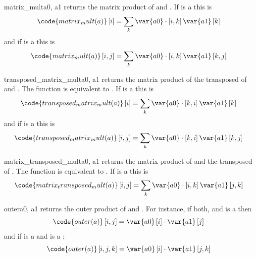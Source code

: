\begin{funcdesc}{matrix_mult}{a0, a1}
returns the matrix product of  and .
If  is a \RankOne this is
\begin{equation}
\code{matrix_mult(a)}\left[i\right]=\sum_{k}\var{a0}  \cdot \left[i,k\right]\var{a1} \left[k\right]
\end{equation}
and if  is a \RankTwo this is
\begin{equation}
\code{matrix_mult(a)}\left[i,j\right]=\sum_{k}\var{a0}  \cdot \left[i,k\right]\var{a1} \left[k,j\right]
\end{equation}
\end{funcdesc}

\begin{funcdesc}{transposed_matrix_mult}{a0, a1}
returns the matrix product of the transposed of  and .
The function is equivalent to .
If  is a \RankOne this is
\begin{equation}
\code{transposed_matrix_mult(a)}\left[i\right]=\sum_{k}\var{a0}  \cdot \left[k,i\right]\var{a1} \left[k\right]
\end{equation}
and if  is a \RankTwo this is
\begin{equation}
\code{transposed_matrix_mult(a)}\left[i,j\right]=\sum_{k}\var{a0}  \cdot \left[k,i\right]\var{a1} \left[k,j\right]
\end{equation}
\end{funcdesc}

\begin{funcdesc}{matrix_transposed_mult}{a0, a1}
returns the matrix product of  and the transposed of .
The function is equivalent to .
If  is a \RankTwo this is
\begin{equation}
\code{matrix_transposed_mult(a)}\left[i,j\right]=\sum_{k}\var{a0}  \cdot \left[i,k\right]\var{a1} \left[j,k\right]
\end{equation}
\end{funcdesc}

\begin{funcdesc}{outer}{a0, a1}
returns the outer product of  and .
For instance, if both,  and  is a \RankOne then
\begin{equation}
\code{outer(a)}\left[i,j\right]=\var{a0} \left[i\right]  \cdot  \var{a1}\left[j\right]
\end{equation}
and if  is a \RankOne and  is a \RankThree:
\begin{equation}
\code{outer(a)}\left[i,j,k\right]=\var{a0} \left[i\right] \cdot \var{a1}\left[j,k\right]
\end{equation}
\end{funcdesc}

